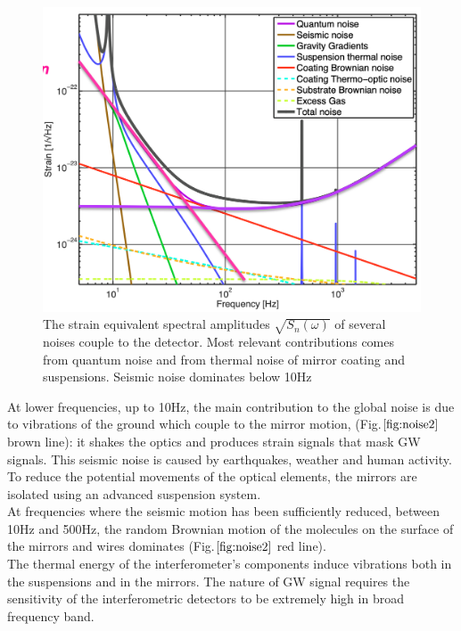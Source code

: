 \documentclass[binding=0.6cm, LaM]{sapthesis}
\begin{document}
		\begin{figure}[H]
                        \includegraphics[scale=0.3]{noise2}
                        \centering
                        \caption{The strain equivalent spectral amplitudes $\sqrt{S_n(\omega)}$ of several noises couple to the detector. Most relevant contributions comes from quantum noise and from thermal noise of mirror coating and suspensions. Seismic noise dominates below 10Hz}
                        \label{fig:noise2}
                \end{figure}
        At lower frequencies, up to 10Hz, the main contribution to the global noise
        is due to vibrations of the ground which couple to the mirror motion, (Fig.$\ref{fig:noise2}$ brown line): 
	it shakes the optics and produces strain signals that mask GW signals. 
        This seismic noise is caused by earthquakes, weather and human activity.
        To reduce the potential movements of the optical elements,
        the mirrors are isolated using an advanced suspension system. \\
        At frequencies where the seismic motion has been sufficiently reduced,
        between 10Hz and 500Hz, the random Brownian motion of the molecules on the surface of the mirrors and wires dominates (Fig.$\ref{fig:noise2}$ red line). \\
        The thermal energy of the interferometer’s components induce vibrations both in the suspensions and in the mirrors.
        The nature of GW signal requires the sensitivity of the interferometric detectors
        to be extremely high in broad frequency band.
\end{document}

